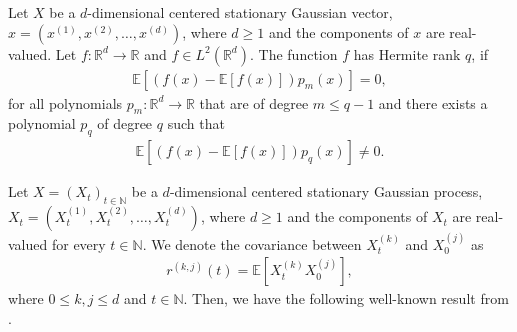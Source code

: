 \documentclass[11pt,a4paper,leqno]{amsart}
\newcommand{\1}{\mathbbm{1}}
\newcommand{\N}{\mathbb{N}}
\newcommand{\E}{\mathbb{E}}
\newcommand{\0}{\mathbf{0}}
\newcommand{\R}{\mathbb{R}}
\begin{document}
\begin{dfn}
Let $X$ be a $d$-dimensional centered stationary Gaussian vector, $x=\left(x^{(1)},x^{(2)},\ldots, x^{(d)} \right)$, where $d \geq 1$ and the components of $x$ are real-valued. Let $f: \R^d \rightarrow \R$ and $f\in L^2\left( \R^d \right)$. The function $f$ has Hermite rank $q$, if
\begin{align*}
\E\left[ \left( f(x) - \E\left[f \left(x\right) \right]\right)p_m(x)\right]=0,
\end{align*}
for all polynomials $p_m: \R^d \rightarrow \R$ that are of degree $m \leq q-1$ and there exists a polynomial $p_q$ of degree $q$ such that
\begin{align*}
\E\left[ \left( f(x) - \E\left[f \left(x\right) \right]\right)p_q(x)\right]\neq 0.
\end{align*}
\end{dfn}
Let $X=\left(X_t\right)_{t\in \N}$ be a $d$-dimensional centered stationary Gaussian process, $X_t=\left(X_t^{(1)},X_t^{(2)},\ldots, X_t^{(d)} \right)$, where $d \geq 1$ and the components of $X_t$ are real-valued for every $t\in \N$. We denote the covariance between $X_t^{(k)}$ and $X_0^{(j)}$ as
\begin{align*}
r^{(k,j)}(t) = \E\left[ X_t^{(k)} X_0^{(j)}\right],
\end{align*}
where $0 \leq k,j \leq d$ and $t\in \N$. Then, we have the following well-known result from \cite{breuer-major}.
\end{document}
